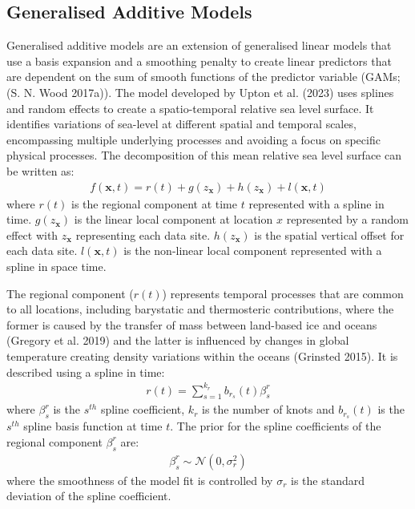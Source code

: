 \hypertarget{generalisedadditivemodels}{%
\subsection{Generalised Additive Models}\label{generalisedadditivemodels}}

Generalised additive models are an extension of generalised linear models that use a basis expansion and a smoothing penalty to create linear predictors that are dependent on the sum of smooth functions of the predictor variable (GAMs; (S. N. Wood 2017a)). The model developed by Upton et al. (2023) uses splines and random effects to create a spatio-temporal relative sea level surface. It identifies variations of sea-level at different spatial and temporal scales, encompassing multiple underlying processes and avoiding a focus on specific physical processes. The decomposition of this mean relative sea level surface can be written as:
\begin{align}
f(\mathbf{x},t) =  r(t)+ g(z_\mathbf{x}) + h(z_\mathbf{x}) + l(\mathbf{x},t)
    \end{align}
where \(r(t)\) is the regional component at time \(t\) represented with a spline in time. \(g(z_{\mathbf{x}})\) is the linear local component at location \(x\) represented by a random effect with \(z_{\mathbf{x}}\) representing each data site. \(h(z_\mathbf{x})\) is the spatial vertical offset for each data site. \(l(\mathbf{x},t)\) is the non-linear local component represented with a spline in space time.

The regional component (\(r(t)\)) represents temporal processes that are common to all locations, including barystatic and thermosteric contributions, where the former is caused by the transfer of mass between land-based ice and oceans (Gregory et al. 2019) and the latter is influenced by changes in global temperature creating density variations within the oceans (Grinsted 2015). It is described using a spline in time:
\begin{align}
r(t) = \sum^{k_r}_{s=1} b_{r_s}(t)\beta^{r}_s
\end{align}
where \(\beta^{r}_s\) is the \(s^{th}\) spline coefficient, \(k_r\) is the number of knots and \(b_{r_s}(t)\) is the \(s^{th}\) spline basis function at time \(t\). The prior for the spline coefficients of the regional component \(\beta^{r}_s\) are:
\begin{align}
  \beta^{r}_s \sim \mathcal{N} ( 0, \sigma_r^2)
\end{align}
where the smoothness of the model fit is controlled by \(\sigma_r\) is the standard deviation of the spline coefficient.

